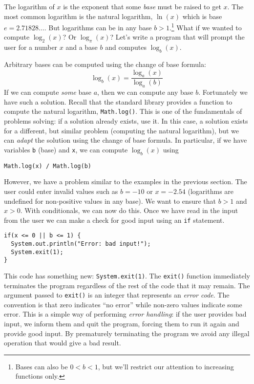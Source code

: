 The logarithm of $x$ is the exponent that some \emph{base} must 
be raised to get $x$.  The most common logarithm is the natural logarithm, 
$\ln{(x)}$ which is base $e = 2.71828\ldots$.  But logarithms can be in any base 
$b > 1$.\footnote{Bases can also be $0< b < 1$, but we'll restrict our attention to
increasing functions only.}  What if we wanted to compute $\log_2{(x)}$?  
Or $\log_{\pi}{(x)}$?  Let's write a program that will prompt the user for a
number $x$ and a base $b$ and computes $\log_b{(x)}$.

Arbitrary bases can be computed using the change of base formula: 
  $$\log_b(x) = \frac{\log_a{(x)}}{\log_a{(b)}}$$
If we can compute \emph{some} base $a$, then we can compute any base 
$b$.  Fortunately we have such a solution.  Recall that the standard library 
provides a function to compute the natural logarithm, \texttt{Math.log()}.
This is one of the fundamentals of problems solving: if a solution already 
exists, use it.  In this case, a solution exists for a different, but similar problem
(computing the natural logarithm), but we can \emph{adapt} the solution 
using the change of base formula.  In particular, if we have variables 
\texttt{b} (base) and \texttt{x}, we can compute $\log_b{(x)}$ using

  \texttt{Math.log(x) / Math.log(b)}
  
However, we have a problem similar to the examples in the previous section.  
The user could enter invalid values such as $b = -10$ or $x = -2.54$ 
(logarithms are undefined for non-positive values in any base).  We want
to ensure that $b > 1$ and $x > 0$.  With conditionals, we can now do this.  
Once we have read in the input from the user we can make a check for
good input using an \texttt{if} statement.

\begin{verbatim}
if(x <= 0 || b <= 1) {
  System.out.println("Error: bad input!");
  System.exit(1);
}
\end{verbatim}

This code has something new: \texttt{System.exit(1)}.  The \texttt{exit()}
function immediately terminates the program regardless of the rest of the
code that it may remain.  The argument passed to \texttt{exit()} is an 
integer that represents an \emph{error code}.  The convention is that 
zero indicates ``no error'' while non-zero values indicate some error.  This
is a simple way of performing \emph{error handling}: if the user provides
bad input, we inform them and quit the program, forcing them to run it
again and provide good input.  By prematurely terminating the program
we avoid any illegal operation that would give a bad result.

